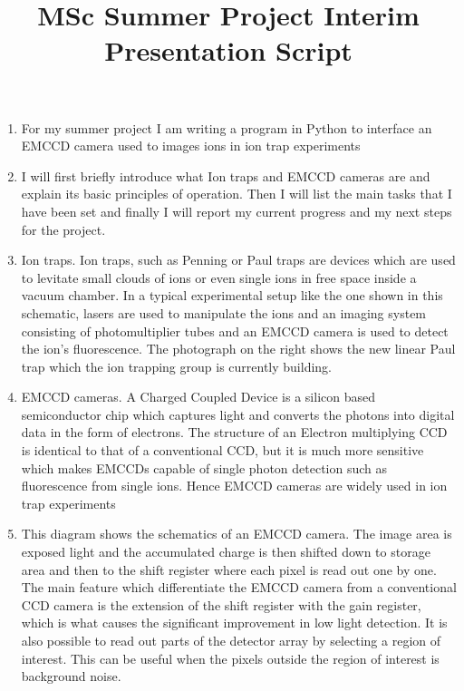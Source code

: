 \documentclass[12pt]{article}
\title{MSc Summer Project Interim Presentation Script}
\begin{document}
\maketitle


\begin{enumerate}
\item For my summer project I am writing a program in Python to interface an EMCCD camera used to images ions in ion trap experiments

\item I will first briefly introduce what Ion traps and EMCCD cameras are and explain its basic principles of operation. Then I will list the main tasks that I have been set and finally I will report my current progress and my next steps for the project.

\item Ion traps. Ion traps, such as Penning or Paul traps are devices which  are used to levitate small clouds of ions or even single ions in free space inside a vacuum chamber. In a typical experimental setup like the one shown in this schematic, lasers are used to manipulate the ions and an imaging system consisting of photomultiplier tubes and an EMCCD camera is used to detect the ion's fluorescence. The photograph on the right shows the new linear Paul trap which the ion trapping group is currently building.

\item EMCCD cameras. A Charged Coupled Device is a silicon based semiconductor chip which captures light and converts the photons into digital data in the form of electrons. The structure of an Electron multiplying CCD is identical to that of a conventional CCD, but it is much more sensitive which makes EMCCDs capable of single photon detection such as fluorescence from single ions. Hence EMCCD cameras are widely used in ion trap experiments

\item This diagram shows the schematics of an EMCCD camera. The image area is exposed light and the accumulated charge is then shifted down to storage area and then to the shift register where each pixel is read out one by one. The main feature which differentiate the EMCCD camera from a conventional CCD camera is the extension of the shift register with the gain register, which is what causes the significant improvement in low light detection. It is also possible to read out parts of the detector array by selecting a region of interest. This can be useful when the pixels outside the region of interest is background noise.


\end{enumerate}
\end{document}
